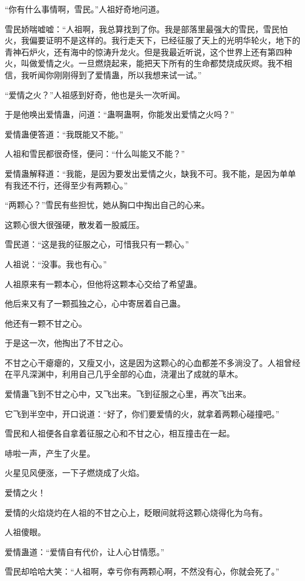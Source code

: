 \begin{this_body}
“你有什么事情啊，雪民。”人祖好奇地问道。

雪民娇喘嘘嘘：“人祖啊，我总算找到了你。我是部落里最强大的雪民，雪民怕火，我偏要证明不是这样的。我行走天下，已经征服了天上的光明华轮火，地下的青神石炉火，还有海中的惊涛升龙火。但是我最近听说，这个世界上还有第四种火，叫做爱情之火。一旦燃烧起来，能把天下所有的生命都焚烧成灰烬。我不相信，我听闻你刚刚得到了爱情蛊，所以我想来试一试。”

“爱情之火？”人祖感到好奇，他也是头一次听闻。

于是他唤出爱情蛊，问道：“蛊啊蛊啊，你能发出爱情之火吗？”

爱情蛊便答道：“我既能又不能。”

人祖和雪民都很奇怪，便问：“什么叫能又不能？”

爱情蛊解释道：“我能，是因为要发出爱情之火，缺我不可。我不能，是因为单单有我还不行，还得至少有两颗心。”

“两颗心？”雪民有些担忧，她从胸口中掏出自己的心来。

这颗心很大很强硬，散发着一股威压。

雪民道：“这是我的征服之心，可惜我只有一颗心。”

人祖说：“没事。我也有心。”

人祖原来有一颗本心，但他将这颗本心交给了希望蛊。

他后来又有了一颗孤独之心，心中寄居着自己蛊。

他还有一颗不甘之心。

于是这一次，他掏出了不甘之心。

不甘之心干瘪瘪的，又瘦又小，这是因为这颗心的心血都差不多淌没了。人祖曾经在平凡深渊中，利用自己几乎全部的心血，浇灌出了成就的草木。

爱情蛊飞到不甘之心中，又飞出来。飞到征服之心里，再次飞出来。

它飞到半空中，开口说道：“好了，你们要爱情的火，就拿着两颗心碰撞吧。”

雪民和人祖便各自拿着征服之心和不甘之心，相互撞击在一起。

哧啦一声，产生了火星。

火星见风便涨，一下子燃烧成了火焰。

爱情之火！

爱情的火焰烧灼在人祖的不甘之心上，眨眼间就将这颗心烧得化为乌有。

人祖傻眼。

爱情蛊道：“爱情自有代价，让人心甘情愿。”

雪民却哈哈大笑：“人祖啊，幸亏你有两颗心啊，不然没有心，你就会死了。”


\end{this_body}
